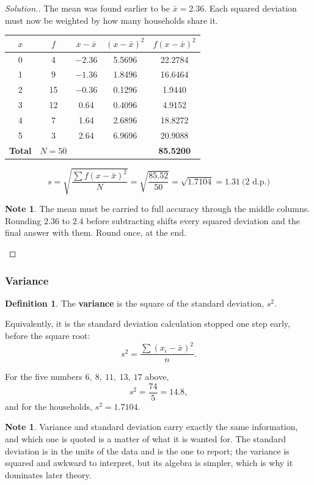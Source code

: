 \documentclass[11pt,a4paper]{article}
\theoremstyle{definition}
\newtheorem{definition}[thm]{Definition}
\newtheorem{note}[thm]{Note}
\newenvironment{solution}
  {\renewcommand{\qedsymbol}{}\begin{proof}[\textit{Solution}.]}
  {\end{proof}}
\begin{document}
\begin{solution}
The mean was found earlier to be $\bar{x}=2.36$. Each squared deviation must now be
weighted by how many households share it.

\begin{table}[H]
\centering
\begin{tabular}{|c|c|c|c|c|}
\hline
$x$ & $f$ & $x-\bar{x}$ & $\left(x-\bar{x}\right)^2$ & $f\left(x-\bar{x}\right)^2$\\
\hline
0 & 4 & $-2.36$ & 5.5696 & 22.2784\\
1 & 9 & $-1.36$ & 1.8496 & 16.6464\\
2 & 15 & $-0.36$ & 0.1296 & 1.9440\\
3 & 12 & 0.64 & 0.4096 & 4.9152\\
4 & 7 & 1.64 & 2.6896 & 18.8272\\
5 & 3 & 2.64 & 6.9696 & 20.9088\\
\hline
\textbf{Total} & $N=50$ & & & \textbf{85.5200}\\
\hline
\end{tabular}
\end{table}

$$s=\sqrt{\frac{\sum f\left(x-\bar{x}\right)^2}{N}}=\sqrt{\frac{85.52}{50}}
=\sqrt{1.7104}=1.31\ \text{(2 d.p.)}$$

\begin{note}
The mean must be carried to full accuracy through the middle columns. Rounding $2.36$
to $2.4$ before subtracting shifts every squared deviation and the final answer with
them. Round once, at the end.
\end{note}
\end{solution}

\subsubsection{Variance}

\begin{definition}
The \textbf{variance} is the square of the standard deviation, $s^2$.
\end{definition}

Equivalently, it is the standard deviation calculation stopped one step early, before
the square root:
$$s^2=\frac{\sum\left(x_i-\bar{x}\right)^2}{n}.$$

For the five numbers $6,\ 8,\ 11,\ 13,\ 17$ above,
$$s^2=\frac{74}{5}=14.8,$$
and for the households, $s^2=1.7104$.

\begin{note}
Variance and standard deviation carry exactly the same information, and which one is
quoted is a matter of what it is wanted for. The standard deviation is in the units of
the data and is the one to report; the variance is squared and awkward to interpret, but
its algebra is simpler, which is why it dominates later theory.
\end{note}
\end{document}
